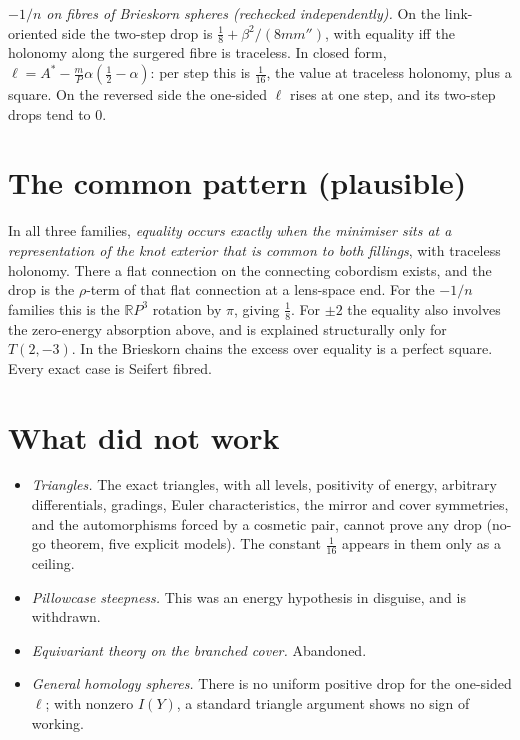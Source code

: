 \documentclass[10pt]{amsart}
\newcommand{\st}[1]{\par\noindent\textit{#1}\enspace}
\begin{document}
\st{$-1/n$ on fibres of Brieskorn spheres (rechecked independently).} On the
link-oriented side the two-step drop is $\frac18+\beta^2/(8mm'')$, with
equality iff the holonomy along the surgered fibre is traceless. In closed form,
$\ell=A^*-\frac mP\alpha(\frac12-\alpha)$: per step this is $\frac1{16}$, the
value at traceless holonomy, plus a square. On the reversed side the one-sided
$\ell$ rises at one step, and its two-step drops tend to $0$.

\section{The common pattern (plausible)}

In all three families, \emph{equality occurs exactly when the minimiser sits at a
representation of the knot exterior that is common to both fillings}, with
traceless holonomy. There a flat connection on the connecting cobordism exists,
and the drop is the $\rho$-term of that flat connection at a lens-space end.
For the $-1/n$ families this is the $\mathbb RP^3$ rotation by $\pi$, giving
$\frac18$. For $\pm2$ the equality also involves the zero-energy absorption above,
and is explained structurally only for $T(2,-3)$. In the Brieskorn chains the
excess over equality is a perfect square. Every exact case is Seifert fibred.

\section{What did not work}

\begin{itemize}
\item \emph{Triangles.} The exact triangles, with all levels, positivity of
energy, arbitrary differentials, gradings, Euler characteristics, the mirror and
cover symmetries, and the automorphisms forced by a cosmetic pair, cannot prove
any drop (no-go theorem, five explicit models). The constant $\frac1{16}$ appears
in them only as a ceiling.
\item \emph{Pillowcase steepness.} This was an energy hypothesis in disguise, and
is withdrawn.
\item \emph{Equivariant theory on the branched cover.} Abandoned.
\item \emph{General homology spheres.} There is no uniform positive drop for the
one-sided $\ell$; with nonzero $I(Y)$, a standard triangle argument shows no sign
of working.
\end{itemize}
\end{document}
